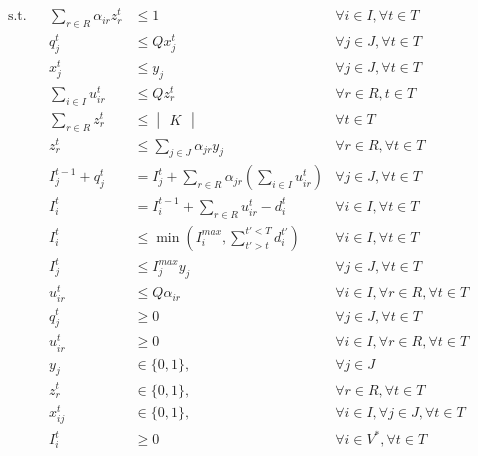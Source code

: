 \documentclass[a4paper,10pt]{article}
\begin{document}
\begin{align}
\text{s.t.}  &&\sum_{r\in R} \alpha_{ir} z^t_r 	&\leq 1 					&\forall i\in I, \forall t\in T  \label{const:customersingleroute}\\
		&&q^t_j 								&\leq Q x^t_j				&\forall j\in J, \forall t\in T \label{const:plantcapacity}\\
		&&x^t_j 								&\leq y_j   				&\forall j\in J, \forall t\in T\label{const:nounselectedroutes}\\
		&&\sum_{i\in I} u^t_{ir}   				&\leq  Q z^t_r 				&\forall r\in R, t\in T\label{const:capacityonroute}\\
		&&\sum_{r\in R} z^t_r 					&\leq \begin{vmatrix} K \end{vmatrix} 					&\forall t\in T\label{const:fleetsizelimitation}\\
		&&z^t_r 								&\leq \sum_{j\in J}\alpha_{jr} y_j 				&\forall r\in R, \forall t\in T\label{const:routestartsfromDC}\\
		&&I^{t-1}_j + q^t_j   					&=I^t_j +\sum_{r\in R}\alpha_{jr} \left(\sum_{i\in I}u^t_{ir}\right) 	&\forall j\in J, \forall t\in T \label{const:flowconversationatDC}\\
		&&I^t_i				&=I^{t-1}_i+ \sum_{r\in R} u^t_{ir}-d^t_i 	&\forall i\in I, \forall t\in T\label{const:flowconservationatcustomer}\\
		&&I^t_i 			&\leq \min(I^{max}_i, \sum_{t'>t}^{t'<T}d^{t'}_i) 		&\forall i\in I, \forall t\in T\label{const:maxinventorycust}\\
		&&I^t_j									&\leq I^{max}_j y_j  				&\forall j\in J,\forall t\in T\label{const:capconstraintatdepot}\\	
		&&u_{ir}^t 			&\leq Q \alpha_{ir}						& \forall i\in I, \forall r\in R,\forall t\in T	\label{const:upperbound-u}\\
		&&q^t_j 						&\geq 0 					& \forall j\in J,\forall t\in T	\\
		&&u^t_{ir}						&\geq 0 					&\forall i\in I, \forall r\in R,\forall t\in T	\\
        &&y_{j}									& \in \{0,1\}, 				&\forall j\in J\label{12}\\	
		&&z^t_r									&\in \{0,1\}, 				&\forall r\in R, \forall t\in T						\label{13}\\
		&&x^t_{ij}								&\in \{0,1\},				&\forall i \in I, \forall j\in J,\forall t\in T		\label{14} \\
		&&I_i^t 								& \geq 0					&\forall i \in V^*, \forall t\in T \\
\end{align}
\end{document}
